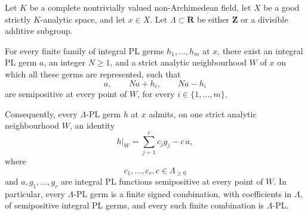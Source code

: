 \begin{theorem}
\label{thm:p09-signed-semipositive-span}
Let \(K\) be a complete nontrivially valued non-Archimedean field, let
\(X\) be a good strictly \(K\)-analytic space, and let \(x\in X\).
Let \(\Lambda\subset\mathbf R\) be either \(\mathbf Z\) or a divisible
additive subgroup.

For every finite family of integral PL germs
\(h_1,\ldots,h_m\) at \(x\), there exist an integral PL germ \(a\), an
integer \(N\geq1\), and a strict analytic neighbourhood \(W\) of \(x\)
on which all these germs are represented, such that
\[
             a,\qquad Na+h_i,\qquad Na-h_i
\]
are semipositive at every point of \(W\), for every
\(i\in\{1,\ldots,m\}\).

Consequently, every \(\Lambda\)-PL germ \(h\) at \(x\) admits, on one
strict analytic neighbourhood \(W\), an identity
\begin{equation}
\label{eq:p09-signed-semipositive-span}
                         h|_W=\sum_{j=1}^{r}c_jg_j-c\,a,
\end{equation}
where
\[
                  c_1,\ldots,c_r,c\in\Lambda_{\geq0}
\]
and \(a,g_1,\ldots,g_r\) are integral PL functions semipositive at every
point of \(W\).  In particular, every \(\Lambda\)-PL germ is a finite
signed combination, with coefficients in \(\Lambda\), of semipositive
integral PL germs, and every such finite combination is \(\Lambda\)-PL.
\end{theorem}
